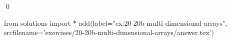 
\begin{ex} 
  \label{ex:20-20b-multi-dimensional-arrays}
  
  \qed
\end{ex} 
\begin{python0}
from solutions import *
add(label="ex:20-20b-multi-dimensional-arrays",
    srcfilename='exercises/20-20b-multi-dimensional-arrays/answer.tex') 
\end{python0}
